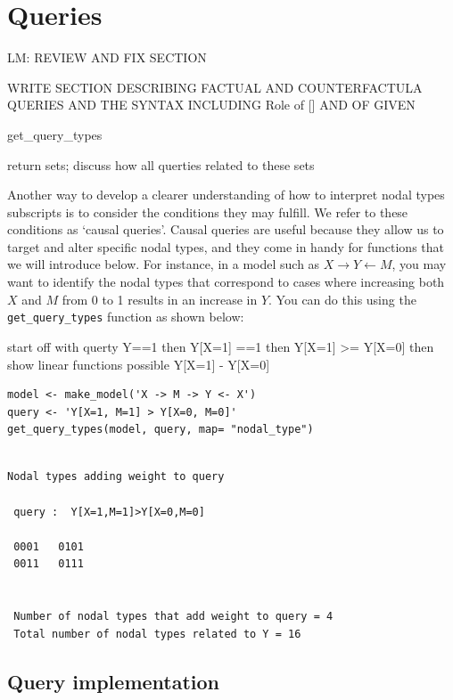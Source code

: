 \documentclass[
  article]{jss}
\begin{document}
\hypertarget{queries}{%
\section{Queries}\label{queries}}

LM: REVIEW AND FIX SECTION

WRITE SECTION DESCRIBING FACTUAL AND COUNTERFACTULA QUERIES AND THE
SYNTAX INCLUDING Role of {[}{]} AND OF GIVEN

get\_query\_types

return sets; discuss how all querties related to these sets

Another way to develop a clearer understanding of how to interpret nodal
types subscripts is to consider the conditions they may fulfill. We
refer to these conditions as `causal queries'. Causal queries are useful
because they allow us to target and alter specific nodal types, and they
come in handy for functions that we will introduce below. For instance,
in a model such as \(X \rightarrow Y \leftarrow M\), you may want to
identify the nodal types that correspond to cases where increasing both
\(X\) and \(M\) from 0 to 1 results in an increase in \(Y\). You can do
this using the \texttt{get\_query\_types} function as shown below:

start off with querty Y==1 then Y{[}X=1{]} ==1 then Y{[}X=1{]}
\textgreater= Y{[}X=0{]} then show linear functions possible Y{[}X=1{]}
- Y{[}X=0{]}

\begin{verbatim}
model <- make_model('X -> M -> Y <- X')
query <- 'Y[X=1, M=1] > Y[X=0, M=0]'
get_query_types(model, query, map= "nodal_type")
\end{verbatim}

\begin{verbatim}

Nodal types adding weight to query

 query :  Y[X=1,M=1]>Y[X=0,M=0] 

 0001   0101
 0011   0111


 Number of nodal types that add weight to query = 4
 Total number of nodal types related to Y = 16
\end{verbatim}

\hypertarget{query-implementation}{%
\subsection{Query implementation}\label{query-implementation}}
\end{document}

